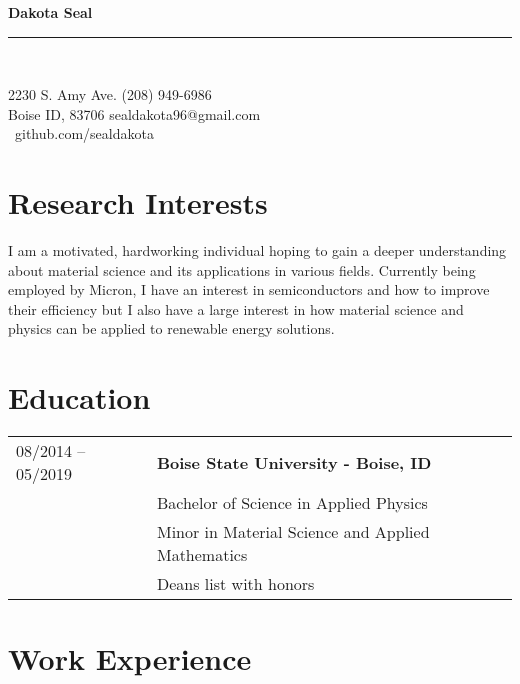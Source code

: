 \documentclass[a4paper,12pt]{article}
\newcommand{\cstmheading}[2]%
        {\begin{minipage}[t]{\textwidth}%
                 {\LARGE \bfseries #1} \\[-0.3\baselineskip]%
                 \rule{\columnwidth}{1.5pt}\\[0.1\baselineskip]
         \end{minipage}}
\begin{document}

\cstmheading{Dakota Seal}\\
2230 S. Amy Ave. \hfill (208) 949-6986 \\
Boise ID, 83706 \hfill sealdakota96@gmail.com\\
\-\ \hfill github.com/sealdakota


\section{Research Interests}
I am a motivated, hardworking individual hoping to gain a deeper understanding about material science and its applications in various fields. Currently being employed by Micron, I have an interest in semiconductors and how to improve their efficiency but I also have a large interest in how material science and physics can be applied to renewable energy solutions. 


\section{Education}
\begin{tabular}{ll}%
08/2014 -- 05/2019 & \textbf{Boise State University - Boise, ID} \\
         & Bachelor of Science in Applied Physics \\
         & Minor in Material Science and Applied Mathematics \\
         & Deans list with honors\\
\end{tabular}


\section{Work Experience}
\end{document}
